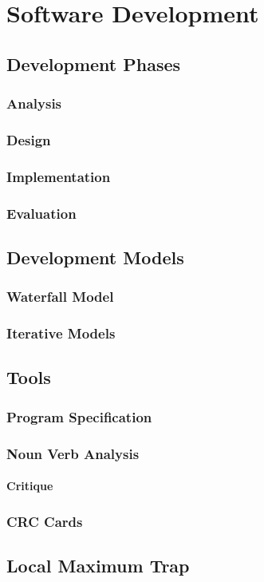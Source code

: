 \chapter{Software Development}

\section{Development Phases}
\subsection{Analysis}
\subsection{Design}
\subsection{Implementation}
\subsection{Evaluation}

\section{Development Models}
\subsection{Waterfall Model}
\subsection{Iterative Models}

\section{Tools}
\subsection{Program Specification}
\subsection{Noun Verb Analysis}
\subsubsection{Critique}
\subsection{CRC Cards}

\section{Local Maximum Trap}


